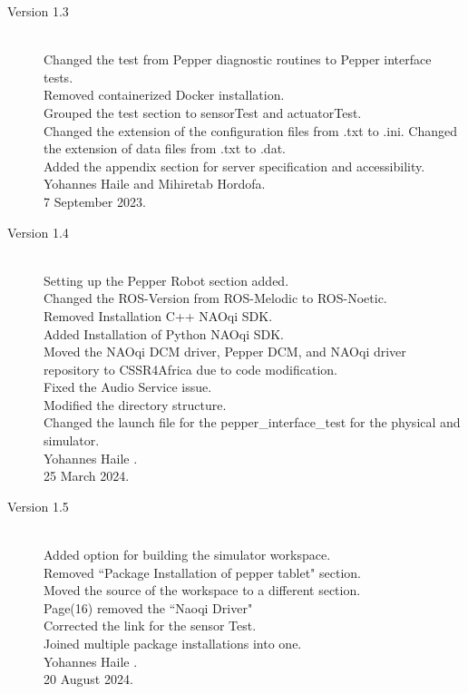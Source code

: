 \documentclass{CSSRforAfrica}
\begin{document}
{\begin{description}
\item [Version 1.3]~\\
Changed the test from Pepper diagnostic routines to Pepper interface tests.\\
Removed containerized Docker installation.\\
Grouped the test section to sensorTest and actuatorTest.\\
Changed the extension of the configuration files from .txt to .ini. Changed the extension of data files from .txt to .dat. \\
Added the appendix section for server specification and accessibility.\\
Yohannes Haile and Mihiretab Hordofa.\\
7 September 2023.

\item [Version 1.4]~\\
Setting up the Pepper Robot section added.\\
Changed the ROS-Version from ROS-Melodic to ROS-Noetic.\\
Removed Installation C++ NAOqi SDK.\\
Added Installation of Python NAOqi SDK.\\
Moved the NAOqi DCM driver, Pepper DCM, and NAOqi driver repository to CSSR4Africa due to code modification.\\
Fixed the Audio Service issue.\\
Modified the directory structure.\\
Changed the launch file for the pepper\_interface\_test for the physical and simulator.\\
Yohannes Haile .\\
25 March 2024.

\newpage

\item [Version 1.5]~\\
Added option for building the simulator workspace.\\
Removed ``Package Installation of pepper tablet" section.\\
Moved the source of the workspace to a different section.\\
Page(16) removed the ``Naoqi Driver" \\
Corrected the link for the sensor Test. \\
Joined multiple package installations into one.\\
Yohannes Haile .\\
20 August 2024.


\end{description}}
\end{document}
